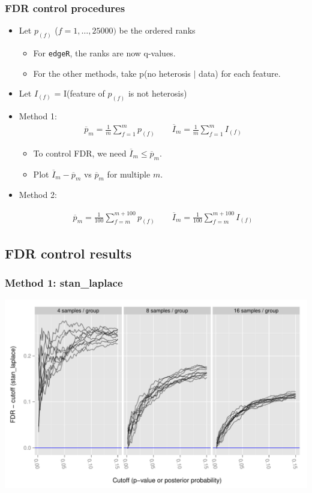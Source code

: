 \documentclass[handout]{beamer}
\providecommand{\ov}[1]{\overline{#1}}
\numberwithin{equation}{section}
\begin{document}
\begin{frame}
\frametitle{FDR control procedures}

\begin{itemize}
\item Let $p_{(f)}$ ($f = 1, \ldots, 25000)$ be the ordered ranks 
\begin{itemize}
\item For {\tt edgeR}, the ranks are now q-values.
\item For the other methods, take p(no heterosis $|$ data) for each feature.
\end{itemize}
\pause \item Let $I_{(f)}$ = I(feature of $p_{(f)}$ is not heterosis)
\item Method 1:
\begin{align*}
\ov{p}_m = \frac{1}{m} \sum_{f = 1}^m p_{(f)} \qquad \ov{I}_m = \frac{1}{m}\sum_{f = 1}^m I_{(f)}
\end{align*}
\begin{itemize}
\pause \item To control FDR, we need $\ov{I}_m \le \ov{p}_m$.
\item Plot $\ov{I}_m - \ov{p}_m$ vs $\ov{p}_m$ for multiple $m$.
\end{itemize}

\pause \item Method 2:

\begin{align*}
\ov{p}_m = \frac{1}{100} \sum_{f = m}^{m + 100} p_{(f)} \qquad \ov{I}_m = \frac{1}{100}\sum_{f = m}^{m + 100} I_{(f)}
\end{align*}
\end{itemize}
\end{frame}

\subsection{FDR control results}


\begin{frame}
\frametitle{Method 1: stan\_laplace}
\begin{center}
\includegraphics[scale=0.5]{fdr-method1stan}
\end{center}
\end{frame}
\end{document}
